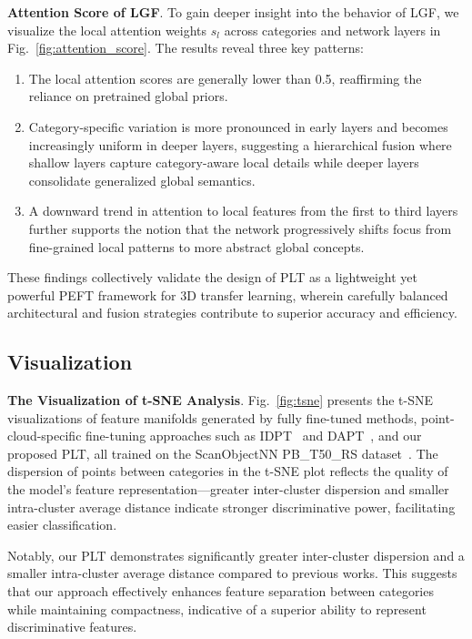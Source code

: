 \textbf{Attention Score of LGF}. To gain deeper insight into the behavior of LGF, we visualize the local attention weights $s_l$ across categories and network layers in Fig.~\ref{fig:attention_score}. The results reveal three key patterns:

\begin{enumerate}
    \item The local attention scores are generally lower than 0.5, reaffirming the reliance on pretrained global priors.
    \item Category-specific variation is more pronounced in early layers and becomes increasingly uniform in deeper layers, suggesting a hierarchical fusion where shallow layers capture category-aware local details while deeper layers consolidate generalized global semantics.
    \item A downward trend in attention to local features from the first to third layers further supports the notion that the network progressively shifts focus from fine-grained local patterns to more abstract global concepts.
\end{enumerate}

These findings collectively validate the design of PLT as a lightweight yet powerful PEFT framework for 3D transfer learning, wherein carefully balanced architectural and fusion strategies contribute to superior accuracy and efficiency.



\subsection{Visualization}

\textbf{The Visualization of t-SNE Analysis}. Fig.~\ref{fig:tsne} presents the t-SNE~\cite{van2008visualizing} visualizations of feature manifolds generated by fully fine-tuned methods, point-cloud-specific fine-tuning approaches such as IDPT~\cite{zha2023instance} and DAPT~\cite{zhou2024dynamic}, and our proposed PLT, all trained on the ScanObjectNN PB\_T50\_RS dataset~\cite{uy2019revisiting}. The dispersion of points between categories in the t-SNE plot reflects the quality of the model's feature representation—greater inter-cluster dispersion and smaller intra-cluster average distance indicate stronger discriminative power, facilitating easier classification.

Notably, our PLT demonstrates significantly greater inter-cluster dispersion and a smaller intra-cluster average distance compared to previous works. This suggests that our approach effectively enhances feature separation between categories while maintaining compactness, indicative of a superior ability to represent discriminative features.

